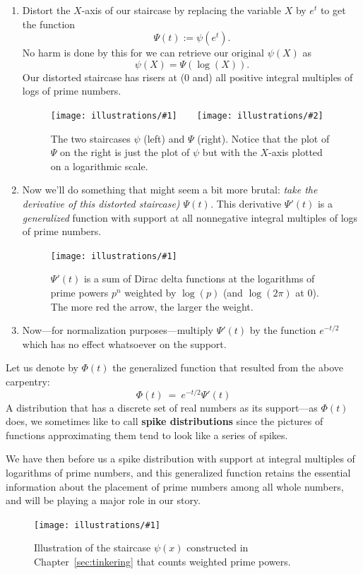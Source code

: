\documentclass[openany]{book}
\newcommand{\ill}[3]{%
   \begin{figure}[H]%
   \vspace{-2ex}
   \centering%
   \texttt{[image: illustrations/\#1]}%
   \caption{#3}%
   \vspace{-2ex}
    \end{figure}}
\newcommand{\illtwo}[4]{%
   \begin{figure}[H]\centering%
   \texttt{[image: illustrations/\#1]}$\qquad$\texttt{[image: illustrations/\#2]}%
   \caption{#4}%
    \end{figure}}
\theoremstyle{plain}
\theoremstyle{definition}
\begin{document}
  
   \begin{enumerate}
   
   \item Distort the $X$-axis of our staircase by replacing the
     variable $X$ by $e^t$ to get the function $$\Psi(t):=
     \psi(e^t).$$ No harm is done by this for we can retrieve our
     original $\psi(X)$ as $$\psi(X) = \Psi(\log(X)).$$ Our distorted
     staircase has risers at ($0$ and) all positive integral multiples
     of logs of prime numbers.
  

     \illtwo{psi_38}{bigPsi_38}{.4}{The two staircases $\psi$ (left)
       and $\Psi$ (right).  Notice that the plot of $\Psi$ on the
       right is just the plot of $\psi$ but with the $X$-axis plotted
       on a logarithmic scale.\label{fig:psi38}}


\item Now we'll do something that might seem a bit more brutal: {\it
    take the derivative of this distorted staircase) $\Psi(t)$.}  This
  derivative $\Psi'(t)$ is a {\it generalized} function with support
  at all nonnegative integral multiples of logs of prime numbers.

  \ill{bigPsi_prime}{1}{$\Psi'(t)$ is a sum of Dirac delta functions
    at the logarithms of prime powers $p^n$ weighted by $\log(p)$ (and
    $\log(2\pi)$ at $0$).  The more red the arrow, the larger the
    weight.}

\item Now---for normalization purposes---multiply $\Psi'(t)$ by the
  function $e^{-t/2}$ which has no effect whatsoever on the support.
  \end{enumerate}

Let us denote by $\Phi(t)$ the generalized function that resulted from the above carpentry:
  $$\Phi(t) \ = \ e^{-t/2}\Psi'(t)$$ 
  A distribution that has a discrete set of real numbers as its
  support---as $\Phi(t)$ does, we sometimes like to call {\bf spike
    distributions} since the pictures of functions approximating them
  tend to look like a series of spikes.
   
  We have then before us a spike distribution with support at integral
  multiples of logarithms of prime numbers, and this generalized
  function retains the essential information about the placement of
  prime numbers among all whole numbers, and will be playing a major
  role in our story.
   
 
\ill{psi_200}{.6}{Illustration of the  staircase $\psi(x)$  constructed in Chapter~\ref{sec:tinkering} that 
counts weighted prime powers.\label{fig:psi_200}}
  
\end{document}
